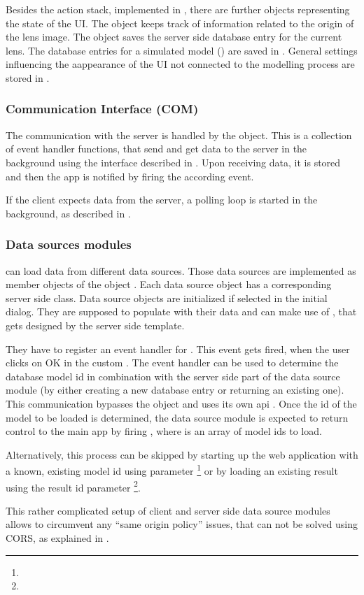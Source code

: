 Besides the action stack, implemented in , there are further objects representing the state of the UI.
The object  keeps track of information related to the origin of the lens image.
The object  saves the server side database entry for the current lens.
The database entries for a simulated model () are saved in .
General settings influencing the aappearance of the UI not connected to the modelling process are stored in .




\subsubsection{Communication Interface (COM)}
The communication with the server is handled by the  object.
This is a collection of event handler functions, that send and get data to the server in the background using the interface described in .
Upon receiving data, it is stored and then the app is notified by firing the according event.

If the client expects data from the server, a polling loop is started in the background, as described in .


\subsubsection{Data sources modules}

\spl can load data from different data sources.
Those data sources are implemented as member objects of the object .
Each data source object has a corresponding server side class.
Data source objects are initialized if selected in the initial dialog.
They are supposed to populate  with their data and can make use of , that gets designed by the server side template.

They have to register an event handler for .
This event gets fired, when the user clicks on OK in the custom .
The event handler can be used to determine the database model id in combination with the server side part of the data source module (by either creating a new database entry or returning an existing one). This communication bypasses the  object and uses its own api .
Once the id of the model to be loaded is determined, the data source module is expected to return control to the main app by firing , where  is an array of model ids to load.

Alternatively, this process can be skipped by starting up the web application with a known, existing model id using  parameter \footnote{\splurl[?mid=42]} or by loading an existing result using the result id  parameter \footnote{\splurl[?rid=1337]}.

This rather complicated setup of client and server side data source modules allows to circumvent any ``same origin policy'' issues, that can not be solved using CORS, as explained in .



